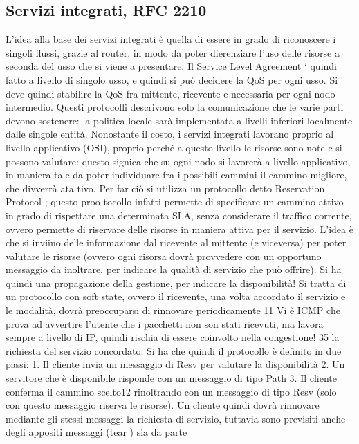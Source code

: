 \subsection{Servizi integrati, RFC 2210}
L'idea alla base dei servizi integrati è quella di essere in grado di riconoscere i
singoli flussi, grazie al router, in modo da poter dierenziare l'uso delle risorse
a seconda del usso che si viene a presentare. Il Service Level Agreement `
quindi fatto a livello di singolo usso, e quindi si può decidere la QoS per ogni
usso. Si deve quindi stabilire la QoS fra mittente, ricevente e necessaria per
ogni nodo intermedio. Questi protocolli descrivono solo la comunicazione che
le varie parti devono sostenere: la politica locale sarà implementata a livelli
inferiori localmente dalle singole entità.
Nonostante il costo, i servizi integrati lavorano proprio al livello applicativo
(OSI), proprio perché a questo livello le risorse sono note e si possono valutare:
questo signica che su ogni nodo si lavorerà a livello applicativo, in maniera tale
da poter individuare fra i possibili cammini il cammino migliore, che divverrà ata
tivo. Per far ciò si utilizza un protocollo detto Reservation Protocol ; questo proo
tocollo infatti permette di specificare un cammino attivo in grado di rispettare
una determinata SLA, senza considerare il traffico corrente, ovvero permette di
riservare delle risorse in maniera attiva per il servizio. L'idea è che si inviino
delle informazione dal ricevente al mittente (e viceversa) per poter valutare le
risorse (ovvero ogni risorsa dovrà provvedere con un opportuno messaggio da
inoltrare, per indicare la qualità di servizio che può offrire). Si ha quindi una
propagazione della gestione, per indicare la disponibilità!
Si tratta di un protocollo con soft state, ovvero il ricevente, una volta accordato il servizio e le modalità, dovrà
preoccuparsi di rinnovare periodicamente
11 Vi è ICMP che prova ad avvertire l'utente che i pacchetti non son stati ricevuti, ma lavora
sempre a livello di IP, quindi rischia di essere coinvolto nella congestione!
35
la richiesta del servizio concordato. Si ha che quindi il protocollo è definito in
due passi:
1. Il cliente invia un messaggio di Resv per valutare la disponibilità
2. Un servitore che è disponibile risponde con un messaggio di tipo Path
3. Il cliente conferma il cammino scelto12 rinoltrando con un messaggio di
tipo Resv (solo con questo messaggio riserva le risorse).
Un cliente quindi dovrà rinnovare mediante gli stessi messaggi la richiesta di
servizio, tuttavia sono previsiti anche degli appositi messaggi (tear ) sia da parte
